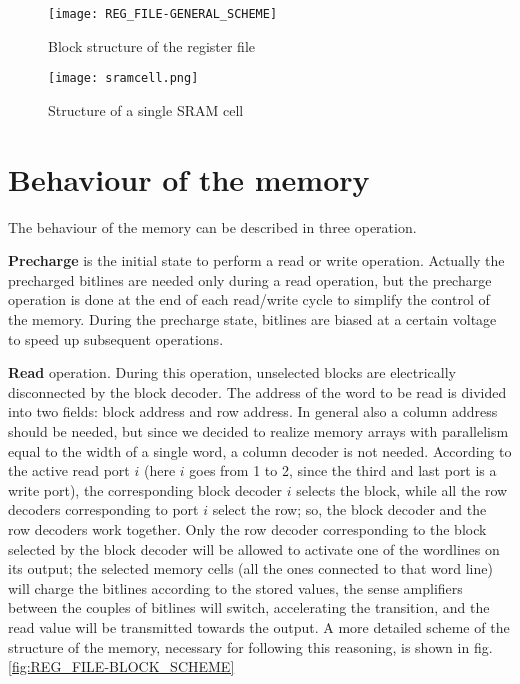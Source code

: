 	\begin{figure}[H] 
		\begin{center}
			\texttt{[image: REG\_FILE-GENERAL\_SCHEME]}
		\end{center}
		\caption{Block structure of the register file} 
		\label{fig:reg_file}
	\end{figure}
	
	\begin{figure}[H] 
		\begin{center}
			\texttt{[image: sramcell.png]}
		\end{center}
		\caption{Structure of a single SRAM cell} 
		\label{fig:cell_structure}
	\end{figure}	

\section{Behaviour of the memory}
The behaviour of the memory can be described in three operation.

\textbf{Precharge} is the initial state to perform a read or write operation. Actually the precharged bitlines are needed only during a read operation, but the precharge operation is done at the end of each read/write cycle to simplify the control of the memory. During the precharge state, bitlines are biased at a certain voltage to speed up subsequent operations.

\textbf{Read} operation. During this operation, unselected blocks are electrically disconnected by the block decoder. The address of the word to be read is divided into two fields: block address and row address. In general also a column address should be needed, but since we decided to realize memory arrays with parallelism equal to the width of a single word, a column decoder is not needed. According to the active read port $i$ (here $i$ goes from 1 to 2, since the third and last port is a write port), the corresponding block decoder $i$ selects the block, while all the row decoders corresponding to port $i$ select the row; so, the block decoder and the row decoders work together. Only the row decoder corresponding to the block selected by the block decoder will be allowed to activate one of the wordlines on its output; the selected memory cells (all the ones connected to that word line) will charge the bitlines according to the stored values, the sense amplifiers between the couples of bitlines will switch, accelerating the transition, and the read value will be transmitted towards the output. A more detailed scheme of the structure of the memory, necessary for following this reasoning, is shown in fig. \ref{fig:REG_FILE-BLOCK_SCHEME}

